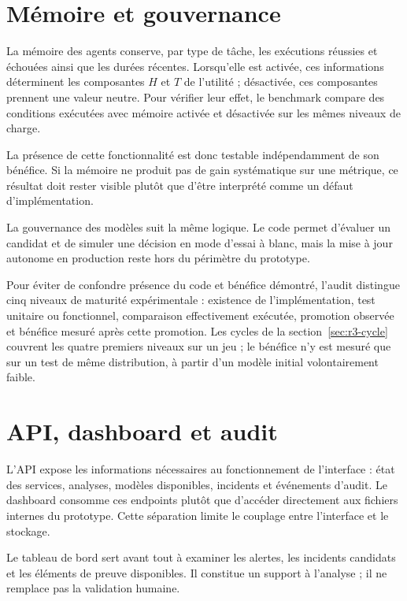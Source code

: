 \section{Mémoire et gouvernance}

La mémoire des agents conserve, par type de tâche, les exécutions réussies et échouées ainsi que les durées récentes. Lorsqu'elle est activée, ces informations déterminent les composantes $H$ et $T$ de l'utilité ; désactivée, ces composantes prennent une valeur neutre. Pour vérifier leur effet, le benchmark compare des conditions exécutées avec mémoire activée et désactivée sur les mêmes niveaux de charge.

La présence de cette fonctionnalité est donc testable indépendamment de son bénéfice. Si la mémoire ne produit pas de gain systématique sur une métrique, ce résultat doit rester visible plutôt que d'être interprété comme un défaut d'implémentation.

La gouvernance des modèles suit la même logique. Le code permet d'évaluer un candidat et de simuler une décision en mode d'essai à blanc, mais la mise à jour autonome en production reste hors du périmètre du prototype.

Pour éviter de confondre présence du code et bénéfice démontré, l'audit distingue cinq niveaux de maturité expérimentale : existence de l'implémentation, test unitaire ou fonctionnel, comparaison effectivement exécutée, promotion observée et bénéfice mesuré après cette promotion. Les cycles de la section~\ref{sec:r3-cycle} couvrent les quatre premiers niveaux sur un jeu ; le bénéfice n'y est mesuré que sur un test de même distribution, à partir d'un modèle initial volontairement faible.


\section{API, dashboard et audit}

L'API expose les informations nécessaires au fonctionnement de l'interface : état des services, analyses, modèles disponibles, incidents et événements d'audit. Le dashboard consomme ces endpoints plutôt que d'accéder directement aux fichiers internes du prototype. Cette séparation limite le couplage entre l'interface et le stockage.

Le tableau de bord sert avant tout à examiner les alertes, les incidents candidats et les éléments de preuve disponibles. Il constitue un support à l'analyse ; il ne remplace pas la validation humaine.

